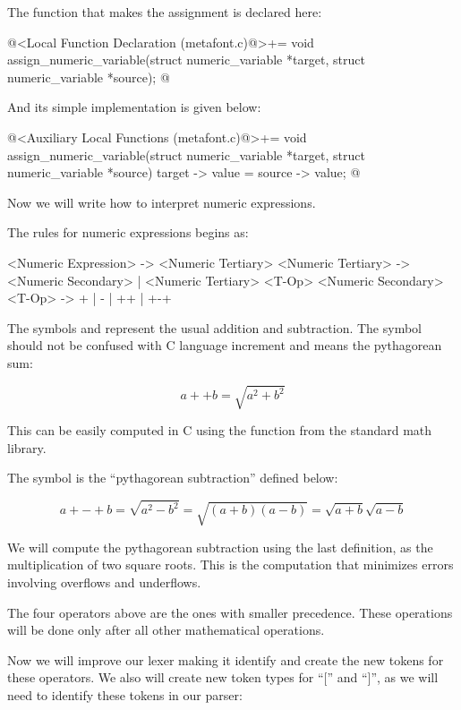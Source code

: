 The function that makes the assignment is declared here:

\iniciocodigo
@<Local Function Declaration (metafont.c)@>+=
void assign_numeric_variable(struct numeric_variable *target,
                            struct numeric_variable *source);
@
\fimcodigo

And its simple implementation is given below:

\iniciocodigo
@<Auxiliary Local Functions (metafont.c)@>+=
void assign_numeric_variable(struct numeric_variable *target,
                            struct numeric_variable *source){
  target -> value = source -> value;
}
@
\fimcodigo

Now we will write how to interpret numeric expressions.


The rules for numeric expressions begins as:

\alinhaverbatim
<Numeric Expression> -> <Numeric Tertiary>
<Numeric Tertiary> -> <Numeric Secondary> |
                      <Numeric Tertiary> <T-Op> <Numeric Secondary>
<T-Op> -> + | - | ++ | +-+
\alinhanormal

The symbols \monoespaco{+} and \monoespaco{-} represent the usual
addition and subtraction. The symbol \monoespaco{++} should not be
confused with C language increment and means the pythagorean sum:

$$
a ++ b = \sqrt{a^2 + b^2}
$$

This can be easily computed in C using the
function  from the standard math library.

The symbol \monoespaco{+-+} is the ``pythagorean subtraction'' defined
below:

$$
a +-+ b = \sqrt{a^2 - b^2} = \sqrt{(a+b)(a-b)} = \sqrt{a+b}\sqrt{a-b}
$$

We will compute the pythagorean subtraction using the last definition,
as the multiplication of two square roots. This is the computation
that minimizes errors involving overflows and underflows.

The four operators above are the ones with smaller precedence. These
operations will be done only after all other mathematical operations.

Now we will improve our lexer making it identify and create the new
tokens for these operators. We also will create new token types for
``['' and ``]'', as we will need to identify these tokens in our
parser:


